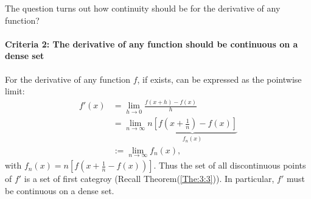 The question turns out how continuity should be for the derivative of any function?
\paragraph{Criteria 2: The derivative of any function should be continuous on a dense set}
For the derivative of any function $f$, if exists, can be expressed as the pointwise limit:
\begin{align*}
f'(x)&=\lim_{h\to0}\frac{f(x+h) - f(x)}{h}\\
&=\lim_{n\to\infty}\underbrace{n\left[f(x+\frac{1}{n}) - f(x)\right]}_{f_n(x)}\\
&:=\lim_{n\to\infty}f_n(x),
\end{align*}
with $f_n(x)=n\left[f(x+\frac{1}{n} - f(x))\right]$. Thus the set of all discontinuous points of $f'$ is a set of first categroy (Recall Theorem(\ref{The:3:3})). In particular, $f'$ must be continuous on a dense set.
